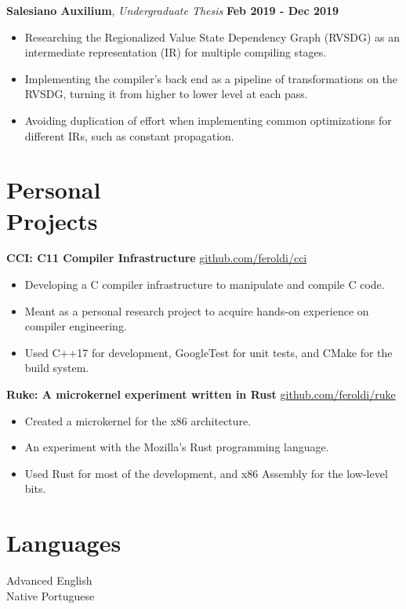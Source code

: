 \documentclass[margin,line]{resume}
\begin{document}
\begin{resume}
    \textbf{Salesiano Auxilium}, \textsl{Undergraduate Thesis} \hfill \textbf{Feb 2019 - Dec 2019}
    \begin{itemize}
        \item Researching the Regionalized Value State Dependency Graph (RVSDG) as an intermediate representation (IR) for multiple compiling stages.
        \item Implementing the compiler's back end as a pipeline of transformations on the RVSDG, turning it from higher to lower level at each pass.
        \item Avoiding duplication of effort when implementing common optimizations for different IRs, such as constant propagation.
    \end{itemize}

    \section{\mysidestyle Personal\\Projects}

    \textbf{CCI: C11 Compiler Infrastructure} \hfill \url{github.com/feroldi/cci}
    \begin{itemize}
        \item Developing a C compiler infrastructure to manipulate and compile C code.
        \item Meant as a personal research project to acquire hands-on experience on compiler engineering.
        \item Used C++17 for development, GoogleTest for unit tests, and CMake for the build system.
    \end{itemize}

    \textbf{Ruke: A microkernel experiment written in Rust} \hfill \url{github.com/feroldi/ruke}
    \begin{itemize}
        \item Created a microkernel for the x86 architecture.
        \item An experiment with the Mozilla's Rust programming language.
        \item Used Rust for most of the development, and x86 Assembly for the low-level bits.
    \end{itemize}

    \section{\mysidestyle Languages}

    Advanced English\\
    Native Portuguese


\end{resume}
\end{document}
